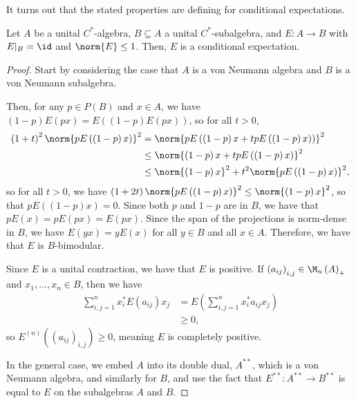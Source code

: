 \documentclass[10pt]{mypackage}
\begin{document}
It turns out that the stated properties are defining for conditional expectations.
\begin{theorem}
  Let $A$ be a unital $C^{\ast}$-algebra, $B\subseteq A$ a unital $C^{\ast}$-subalgebra, and $E\colon A\rightarrow B$ with $E|_{B} = \id$ and $\norm{E}\leq 1$. Then, $E$ is a conditional expectation.
\end{theorem}
\begin{proof}
  Start by considering the case that $A$ is a von Neumann algebra and $B$ is a von Neumann subalgebra.

  Then, for any $p\in P(B)$ and $x\in A$, we have $\left( 1-p \right)E\left( px \right) = E\left( \left( 1-p \right)E\left( px \right) \right)$, so for all $t > 0$,
  \begin{align*}
    \left( 1+t \right)^2 \norm{pE\left( \left( 1-p \right)x \right)}^2 &= \norm{pE\left( \left( 1-p \right)x + tpE\left( \left( 1-p \right)x \right) \right)}^2\\
                                                                       &\leq \norm{\left( 1-p \right)x + tpE\left( \left( 1-p \right)x \right)}^2\\
                                                                       &\leq \norm{\left( 1-p \right)x}^2 + t^2 \norm{pE\left( \left( 1-p \right)x \right)}^2,
  \end{align*}
  so for all $t > 0$, we have $\left( 1+2t \right)\norm{pE\left( \left( 1-p \right)x \right)}^2\leq \norm{\left( 1-p \right)x}^2$, so that $pE\left( \left( 1-p \right)x \right) = 0$. Since both $p$ and $1-p$ are in $B$, we have that $pE(x) = pE(px) = E(px)$. Since the span of the projections is norm-dense in $B$, we have $E\left( yx \right) = yE(x)$ for all $y\in B$ and all $x\in A$. Therefore, we have that $E$ is $B$-bimodular.

  Since $ E $ is a unital contraction, we have that $E$ is positive. If $\left( a_{ij} \right)_{i,j}\in \M_n\left( A \right)_{+}$ and $x_1,\dots,x_n\in B$, then we have
  \begin{align*}
    \sum_{i,j=1}^{n}x_i^{\ast}E\left( a_{ij} \right)x_j &= E\left( \sum_{i,j=1}^{n}x_i^{\ast}a_{ij}x_j \right)\\
                                                        &\geq 0,
  \end{align*}
  so $E^{(n)}\left( \left( a_{ij} \right)_{i,j} \right)\geq 0$, meaning $E$ is completely positive.

  In the general case, we embed $A$ into its double dual, $A^{\ast\ast}$, which is a von Neumann algebra, and similarly for $B$, and use the fact that $E^{\ast\ast}\colon A^{\ast\ast}\rightarrow B^{\ast\ast}$ is equal to $E$ on the subalgebras $A$ and $B$.
\end{proof}
\end{document}

